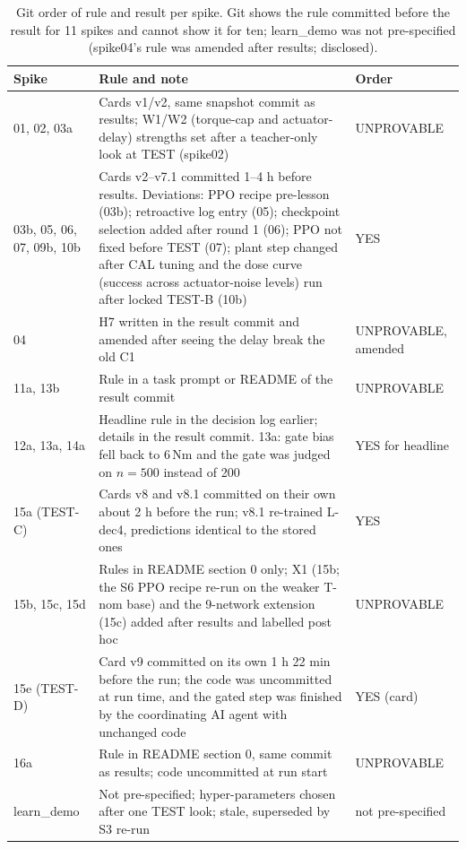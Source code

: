 \begin{table}[htbp]
\centering
\caption{Git order of rule and result per spike. Git shows the rule committed before the result for 11 spikes and cannot show it for ten; learn\_demo was not pre-specified (spike04's rule was amended after results; disclosed).}
\label{tab:audit}
\begin{tabular}{@{}p{3.3cm}p{9.2cm}l@{}}
\toprule
Spike & Rule and note & Order \\ \midrule
01, 02, 03a & Cards v1/v2, same snapshot commit as results; W1/W2 (torque-cap and actuator-delay) strengths set after a teacher-only look at TEST (spike02) & UNPROVABLE \\
03b, 05, 06, 07, 09b, 10b & Cards v2--v7.1 committed 1--4 h before results. Deviations: PPO recipe pre-lesson (03b); retroactive log entry (05); checkpoint selection added after round 1 (06); PPO not fixed before TEST (07); plant step changed after CAL tuning and the dose curve (success across actuator-noise levels) run after locked TEST-B (10b) & YES \\
04 & H7 written in the result commit and amended after seeing the delay break the old C1 & UNPROVABLE, amended \\
11a, 13b & Rule in a task prompt or README of the result commit & UNPROVABLE \\
12a, 13a, 14a & Headline rule in the decision log earlier; details in the result commit. 13a: gate bias fell back to 6\,Nm and the gate was judged on $n{=}500$ instead of 200 & YES for headline \\
15a (TEST-C) & Cards v8 and v8.1 committed on their own about 2 h before the run; v8.1 re-trained L-dec4, predictions identical to the stored ones & YES \\
15b, 15c, 15d & Rules in README section 0 only; X1 (15b; the S6 PPO recipe re-run on the weaker T-nom base) and the 9-network extension (15c) added after results and labelled post hoc & UNPROVABLE \\
15e (TEST-D) & Card v9 committed on its own 1 h 22 min before the run; the code was uncommitted at run time, and the gated step was finished by the coordinating AI agent with unchanged code & YES (card) \\
16a & Rule in README section 0, same commit as results; code uncommitted at run start & UNPROVABLE \\
learn\_demo & Not pre-specified; hyper-parameters chosen after one TEST look; stale, superseded by S3 re-run & not pre-specified \\
\bottomrule
\end{tabular}
\end{table}

